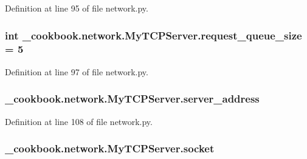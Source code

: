 Definition at line 95 of file network.\-py.

\hypertarget{class__cookbook_1_1network_1_1MyTCPServer_af80f389b881aac1996ab9258d8507db0}{
\subsubsection[{request\-\_\-queue\-\_\-size}]{\setlength{\rightskip}{0pt plus 5cm}int \-\_\-cookbook.\-network.\-My\-T\-C\-P\-Server.\-request\-\_\-queue\-\_\-size = 5\hspace{0.3cm}{\ttfamily [static]}}}\label{class__cookbook_1_1network_1_1MyTCPServer_af80f389b881aac1996ab9258d8507db0}


Definition at line 97 of file network.\-py.

\hypertarget{class__cookbook_1_1network_1_1MyTCPServer_a5d05dd8cc8114a343c9622b65340ee59}{
\subsubsection[{server\-\_\-address}]{\setlength{\rightskip}{0pt plus 5cm}\-\_\-cookbook.\-network.\-My\-T\-C\-P\-Server.\-server\-\_\-address}}\label{class__cookbook_1_1network_1_1MyTCPServer_a5d05dd8cc8114a343c9622b65340ee59}


Definition at line 108 of file network.\-py.

\hypertarget{class__cookbook_1_1network_1_1MyTCPServer_a6ff2e7ff8e8cabc2ea5e57b0c03474b3}{
\subsubsection[{socket}]{\setlength{\rightskip}{0pt plus 5cm}\-\_\-cookbook.\-network.\-My\-T\-C\-P\-Server.\-socket}}\label{class__cookbook_1_1network_1_1MyTCPServer_a6ff2e7ff8e8cabc2ea5e57b0c03474b3}


